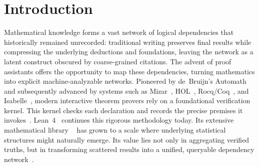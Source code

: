\section{Introduction}
Mathematical knowledge forms a vast network of logical dependencies that historically remained unrecorded: traditional writing preserves final results while compressing the underlying deductions and foundations, leaving the network as a latent construct obscured by coarse-grained citations. The advent of proof assistants offers the opportunity to map these dependencies, turning mathematics into explicit machine-analyzable networks. Pioneered by de~Bruijn's Automath~\cite{debruijn1970} and subsequently advanced by systems such as Mizar~\cite{trybulec1978}, HOL~\cite{gordon1993}, Rocq\slash Coq~\cite{coquand1988}, and Isabelle~\cite{paulson1994}, modern interactive theorem provers rely on a foundational verification kernel. This kernel checks each declaration and records the precise premises it invokes~\cite{avigad2024}. Lean~4~\cite{lean4} continues this rigorous methodology today. Its extensive mathematical library ~\cite{mathlib2020} has grown to a scale where underlying statistical structures might naturally emerge. Its value lies not only in aggregating verified truths, but in transforming scattered results into a unified, queryable dependency network~\cite{feng2026erdos}.

